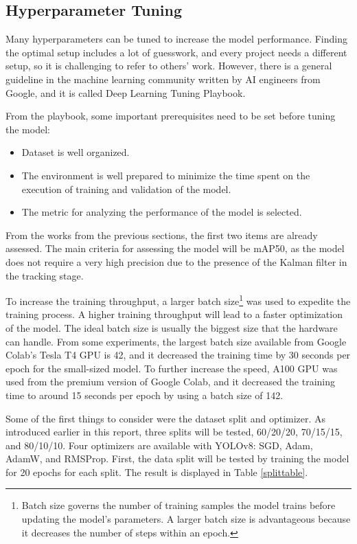 \subsection{Hyperparameter Tuning}\label{hyper}
Many hyperparameters can be tuned to increase the model performance. Finding the optimal setup includes a lot of guesswork, and every project needs a different setup, so it is challenging to refer to others' work. However, there is a general guideline in the machine learning community written by AI engineers from Google, and it is called Deep Learning Tuning Playbook. \cite{tuningplaybookgithub} 

From the playbook, some important prerequisites need to be set before tuning the model:
\begin{itemize}
    \item Dataset is well organized.
    \item The environment is well prepared to minimize the time spent on the execution of training and validation of the model.
    \item The metric for analyzing the performance of the model is selected.
\end{itemize}

From the works from the previous sections, the first two items are already assessed. The main criteria for assessing the model will be mAP50, as the model does not require a very high precision due to the presence of the Kalman filter in the tracking stage. 

To increase the training throughput, a larger batch size\footnote{Batch size governs the number of training samples the model trains before updating the model's parameters. A larger batch size is advantageous because it decreases the number of steps within an epoch.} was used to expedite the training process. A higher training throughput will lead to a faster optimization of the model. The ideal batch size is usually the biggest size that the hardware can handle. From some experiments, the largest batch size available from Google Colab's Tesla T4 GPU is 42, and it decreased the training time by 30 seconds per epoch for the small-sized model. To further increase the speed, A100 GPU was used from the premium version of Google Colab, and it decreased the training time to around 15 seconds per epoch by using a batch size of 142. 

Some of the first things to consider were the dataset split and optimizer. As introduced earlier in this report, three splits will be tested, 60/20/20, 70/15/15, and 80/10/10. Four optimizers are available with YOLOv8: SGD, Adam, AdamW, and RMSProp. First, the data split will be tested by training the model for 20 epochs for each split. The result is displayed in Table \ref{splittable}.

